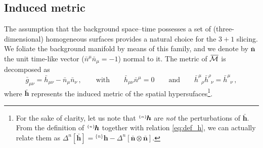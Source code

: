 \documentclass[notitlepage,onecolumn,floatfix,preprintnumbers,aps,prd,showpacs,nofootinbib,amsmath,amssymb,amsfonts]{revtex4-1}
\newcommand{\be}{\begin{equation}}
\newcommand{\ee}{\end{equation}}
\newcommand{\<}{\langle}
\renewcommand{\>}{\rangle}
\newcommand{\pert}[2]{{}^{\mbox{\,\tiny $\{#1\}\!$}}{#2}}
\begin{document}
\subsection{Induced metric}

The assumption that the background space--time possesses a set of (three-dimensional) homogeneous surfaces 
provides a natural choice for the $3+1$ slicing. We foliate the background manifold by means of this family, 
and we denote by $\bm{\bar n}$ the unit time-like vector ($\bar n^\mu \bar n_\mu = -1$) normal to it. 
The metric of $\, \overline{\! \cal M}$ is decomposed as 
\be \label{eq:def_h}
	\bar g_{\mu\nu} 
		= \bar h_{\mu\nu} - \bar n_\mu \bar n_\nu \, , 
	\qquad \mathrm{with} \qquad 
		\bar h_{\mu \nu} \bar n^\mu = 0 
	\qquad \mathrm{and} \qquad 
		\bar h^\mu_{\phantom{\mu} \rho} \bar h^\rho_{\phantom{\rho} \nu} = \bar h^\mu_{\phantom{\mu} \nu} \, ,
\ee
where $\bm{\bar h}$ represents the induced metric of the spatial hypersufaces\footnote{%
%
For the sake of clarity, let us note that $\! \pert{n}{\bm h}$ are \textit{not} the perturbations of $\bm{\bar h}$. 
From the definition of $\! \pert{n}{\bm h}$ together with relation \eqref{eq:def_h}, we can actually relate them as 
$\Delta^n[\bm{\bar h}] = \! {}^{\{n\}} \bm{h} - \Delta^n[\bm{\bar n} \otimes \bm{\bar n}]$. 
%
%
}. 
\end{document}
